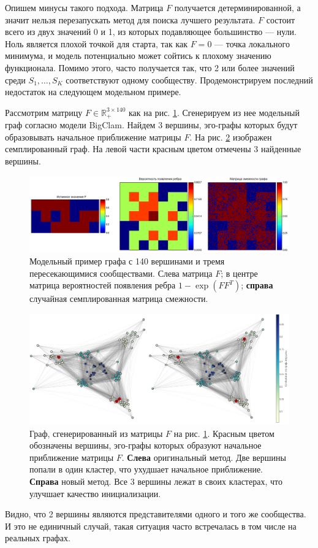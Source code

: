 \documentclass{ITaSconf}
\def\RR{\mathbb{R}}
\begin{document}
	Опишем минусы такого подхода. 
	Матрица $F$ получается детерминированной, а значит нельзя перезапускать метод для поиска лучшего результата.
	$F$ состоит всего из двух значений 0 и 1, из которых подавляющее большинство --- нули. 
	Ноль является плохой точкой для старта, так как $F=0$ --- точка локального минимума, и модель потенциально может сойтись к плохому значению функционала.
	Помимо этого, часто получается так, что 2 или более значений среди $S_1, \dots, S_K$ соответствуют одному сообществу. 
	Продемонстрируем последний недостаток на следующем модельном примере.
	
	Рассмотрим матрицу $F\in \RR_{+}^{3\times 140}$ как на рис. \ref{fig:model_ex}. 
	Сгенерируем из нее модельный граф согласно модели BigClam. 
	Найдем 3 вершины, эго-графы которых будут образовывать начальное приближение матрицы $F$. 
	На рис. \ref{fig:model_ex_graph} изображен семплированный граф. 
	На левой части красным цветом отмечены 3 найденные вершины.
	\begin{figure}[!ht]
		\centering
		\includegraphics[width=\linewidth]{imgs/model_example.png}
		\caption{Модельный пример графа с 140 вершинами и тремя пересекающимися сообществами. Слева матрица $F$; в центре матрица вероятностей появления ребра $1-\exp(FF^T)$; \textbf{справа} случайная семплированная матрица смежности.}
		\label{fig:model_ex}
	\end{figure}
	\begin{figure}[!ht]
		\centering
		\includegraphics[width=\linewidth]{imgs/model_example_graph_good_init_pres.png}
		\caption{Граф, сгенерированный из матрицы $F$ на рис. \ref{fig:model_ex}. Красным цветом обозначены вершины, эго-графы которых образуют начальное приближение матрицы $F$. \textbf{Слева} оригинальный метод. Две вершины попали в один кластер, что ухудшает начальное приближение. \textbf{Справа} новый метод. Все 3 вершины лежат в своих кластерах, что улучшает качество инициализации.}
		\label{fig:model_ex_graph}
	\end{figure}
	Видно, что 2 вершины являются представителями одного и того же сообщества. 
	И это не единичный случай, такая ситуация часто встречалась в том числе на реальных графах. 
	
\end{document}
